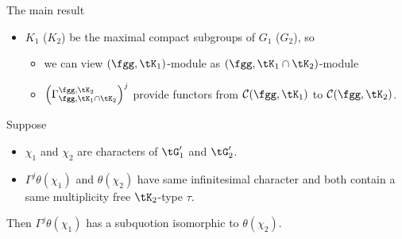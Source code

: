 \documentclass[final,hyperref={pdfpagelabels=false}]{beamer} %
\def\cR{{\mathcal{R}}}
\def\cC{\mathcal{C}}
\begin{document}
\begin{frame}
\begin{columns}[t]
\begin{column}{.48\linewidth}
\begin{block}{The main result}
\begin{itemize}
      \item $K_1$ ($K_2$) be the maximal compact subgroups of $G_1$ ($G_2$), so
        \begin{itemize}
        \item we can view $(\fgg, \tK_1)$-module 
          as $(\fgg, \tK_1\cap \tK_2)$-module
        \item $\left(\Gamma_{\fgg,\tK_1\cap \tK_2}^{\fgg,\tK_2}\right)^j$ provide functors 
          from $\cC(\fgg, \tK_1)$ to $\cC(\fgg,\tK_2)$.
        \end{itemize}
     \end{itemize}
     Suppose
     \begin{itemize}
        \item $\chi_1$ and $\chi_2$ are characters of $\tG'_1$ and $\tG'_2$.
      \item $\Gamma^j\theta(\chi_1)$ and  $\theta(\chi_2)$ 
        have same infinitesimal character
        and both contain a same multiplicity free $\tK_2$-type $\tau$.
      \end{itemize}
      Then 
      $\Gamma^j\theta(\chi_1)$ 
      has a subquotion isomorphic to $\theta(\chi_2)$.
    \end{block}
    
\end{column}
\end{columns}
\end{frame}
\end{document}

